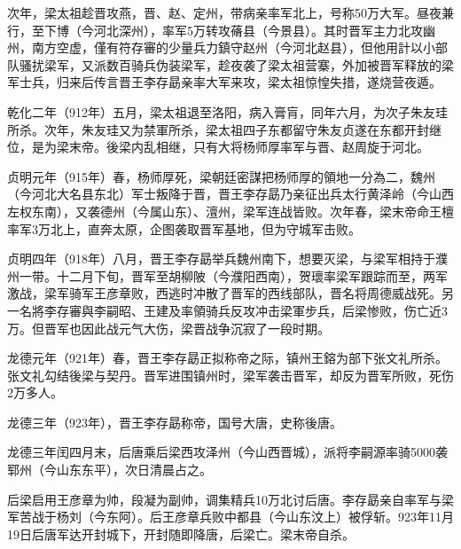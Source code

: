 次年，梁太祖趁晋攻燕，晋、赵、定州，带病亲率军北上，号称50万大军。昼夜兼行，至下博（今河北深州），率军5万转攻蓨县（今景县）。其时晋军主力北攻幽州，南方空虚，僅有符存審的少量兵力鎮守赵州（今河北赵县），但他用計以小部队骚扰梁军，又派数百骑兵伪装梁军，趁夜袭了梁太祖营寨，外加被晋军释放的梁军士兵，归来后传言晋王李存勗亲率大军来攻，梁太祖惊惶失措，遂烧营夜遁。

乾化二年（912年）五月，梁太祖退至洛阳，病入膏肓，同年六月，为次子朱友珪所杀。次年，朱友珪又为禁軍所杀，梁太祖四子东都留守朱友贞遂在东都开封继位，是为梁末帝。後梁内乱相继，只有大将杨师厚率军与晋、赵周旋于河北。

贞明元年（915年）春，杨师厚死，梁朝廷密謀把杨师厚的領地一分為二，魏州（今河北大名县东北）军士叛降于晋，晋王李存勗乃亲征出兵太行黄泽岭（今山西左权东南），又袭德州（今属山东）、澶州，梁军连战皆败。次年春，梁末帝命王檀率军3万北上，直奔太原，企图袭取晋军基地，但为守城军击败。

贞明四年（918年）八月，晋王李存勗举兵魏州南下，想要灭梁，与梁军相持于濮州一带。十二月下旬，晋军至胡柳陂（今濮阳西南），贺瓌率梁军跟踪而至，两军激战，梁军骑军王彦章败，西逃时冲散了晋军的西线部队，晋名将周德威战死。另一名將李存審與李嗣昭、王建及率領骑兵反攻冲击梁軍步兵，后梁惨败，伤亡近3万。但晋军也因此战元气大伤，梁晋战争沉寂了一段时期。

龙德元年（921年）春，晋王李存勗正拟称帝之际，镇州王鎔为部下张文礼所杀。张文礼勾结後梁与契丹。晋军进围镇州时，梁军袭击晋军，却反为晋军所败，死伤2万多人。

龙德三年（923年），晋王李存勗称帝，国号大唐，史称後唐。

龙德三年闰四月末，后唐乘后梁西攻泽州（今山西晋城），派将李嗣源率骑5000袭郓州（今山东东平），次日清晨占之。

后梁启用王彦章为帅，段凝为副帅，调集精兵10万北讨后唐。李存勗亲自率军与梁军苦战于杨刘（今东阿）。后王彦章兵败中都县（今山东汶上）被俘斩。923年11月19日后唐军达开封城下，开封随即降唐，后梁亡。梁末帝自杀。






